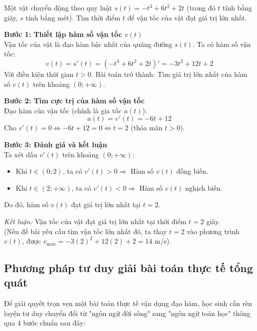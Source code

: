 \documentclass[12pt]{article}
\begin{document}
	\begin{vidu}[1]
		Một vật chuyển động theo quy luật $s(t) = -t^3 + 6t^2 + 2t$ (trong đó $t$ tính bằng giây, $s$ tính bằng mét). Tìm thời điểm $t$ để vận tốc của vật đạt giá trị lớn nhất.
	\end{vidu}
	
	\begin{loigiai}
		\textbf{Bước 1: Thiết lập hàm số vận tốc $v(t)$} \\
		Vận tốc của vật là đạo hàm bậc nhất của quãng đường $s(t)$. Ta có hàm số vận tốc:
		\[ v(t) = s'(t) = \left( -t^3 + 6t^2 + 2t \right)' = -3t^2 + 12t + 2 \]
		Với điều kiện thời gian $t > 0$. Bài toán trở thành: Tìm giá trị lớn nhất của hàm số $v(t)$ trên khoảng $(0; +\infty)$.
		
		\vspace{2mm}
		\textbf{Bước 2: Tìm cực trị của hàm số vận tốc} \\
		Đạo hàm của vận tốc (chính là gia tốc $a(t)$):
		\[ a(t) = v'(t) = -6t + 12 \]
		Cho $v'(t) = 0 \Leftrightarrow -6t + 12 = 0 \Leftrightarrow t = 2$ (thỏa mãn $t > 0$).
		
		\vspace{2mm}
		\textbf{Bước 3: Đánh giá và kết luận} \\
		Ta xét dấu $v'(t)$ trên khoảng $(0; +\infty)$:
		\begin{itemize}
			\item Khi $t \in (0; 2)$, ta có $v'(t) > 0 \Rightarrow$ Hàm số $v(t)$ đồng biến.
			\item Khi $t \in (2; +\infty)$, ta có $v'(t) < 0 \Rightarrow$ Hàm số $v(t)$ nghịch biến.
		\end{itemize}
		Do đó, hàm số $v(t)$ đạt giá trị lớn nhất tại $t = 2$.
		
		\vspace{2mm}
		\textit{Kết luận:} Vận tốc của vật đạt giá trị lớn nhất tại thời điểm $t = 2$ giây. 
		\\ (Nếu đề bài yêu cầu tìm vận tốc lớn nhất đó, ta thay $t = 2$ vào phương trình $v(t)$, được $v_{\max} = -3(2)^2 + 12(2) + 2 = 14$ m/s).
	\end{loigiai}
	
	\subsection{Phương pháp tư duy giải bài toán thực tế tổng quát}
	
	Để giải quyết trọn vẹn một bài toán thực tế vận dụng đạo hàm, học sinh cần rèn luyện tư duy chuyển đổi từ "ngôn ngữ đời sống" sang "ngôn ngữ toán học" thông qua 4 bước chuẩn sau đây:
	
\end{document}
